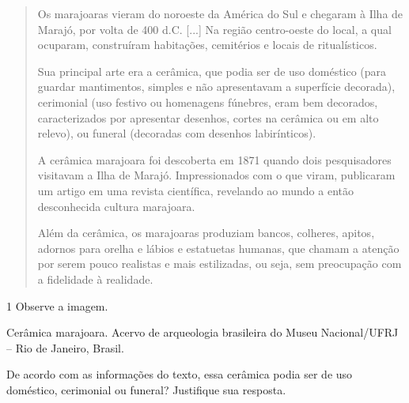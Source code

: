 \begin{quote}
Os marajoaras vieram do noroeste da América do Sul e chegaram à Ilha de
Marajó, por volta de 400 d.C. {[}...{]} Na região centro-oeste do local,
a qual ocuparam, construíram habitações, cemitérios e locais de
ritualísticos.

Sua principal arte era a cerâmica, que podia ser de uso doméstico (para
guardar mantimentos, simples e não apresentavam a superfície decorada),
cerimonial (uso festivo ou homenagens fúnebres, eram bem decorados,
caracterizados por apresentar desenhos, cortes na cerâmica ou em alto
relevo), ou funeral (decoradas com desenhos labirínticos).




A cerâmica marajoara foi descoberta em 1871 quando dois pesquisadores
visitavam a Ilha de Marajó. Impressionados com o que viram, publicaram
um artigo em uma revista científica, revelando ao mundo a então
desconhecida cultura marajoara.

Além da cerâmica, os marajoaras produziam bancos, colheres, apitos,
adornos para orelha e lábios e estatuetas humanas, que chamam a atenção
por serem pouco realistas e mais estilizadas, ou seja, sem preocupação
com a fidelidade à realidade.

\end{quote}

\num{1} Observe a imagem.

Cerâmica marajoara. Acervo de arqueologia brasileira do Museu
Nacional/UFRJ -- Rio de Janeiro, Brasil.


De acordo com as informações do texto, essa cerâmica podia ser de uso
doméstico, cerimonial ou funeral? Justifique sua resposta.



